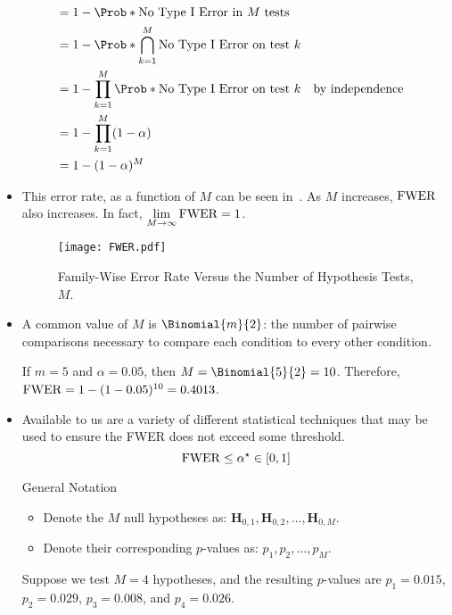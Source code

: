\begin{itemize}
\begin{align*}
               & =1-\Prob*{\text{No Type I Error in $ M $ tests}}                                           \\
               & =1-\Prob*{\bigcap_{k=1}^M\text{No Type I Error on test $ k $}}                             \\
               & =1-\prod_{k=1}^M\Prob*{\text{No Type I Error on test $ k $}}   &  & \text{by independence} \\
               & =1-\prod_{k=1}^M(1-\alpha)                                                                 \\
               & =1-(1-\alpha)^M
          \end{align*}
    \item This error rate, as a function of $M$ can be seen in~. As $ M $ increases, $ \operatorname{FWER} $ also increases.
          In fact, $ \lim\limits_{{M} \to {\infty}} \operatorname{FWER}=1 $.
          \begin{figure}[!htbp]
              \centering
              \texttt{[image: FWER.pdf]}
              \caption{Family-Wise Error Rate Versus the Number of Hypothesis Tests, $M$.}\label{fig:FWER}
          \end{figure}
    \item A common value of $ M $ is $ \Binomial{m}{2} $: the number of pairwise comparisons necessary to compare each condition
          to every other condition.
          \begin{Example}{}{}
              If $ m=5 $ and $ \alpha=0.05 $, then $ M=\Binomial{5}{2}=10 $. Therefore, $ \operatorname{FWER}=1-(1-0.05)^{10}=0.4013 $.
          \end{Example}
    \item Available to us are a variety of different statistical techniques that may be used to ensure the FWER
          does not exceed some threshold.
          \[ \operatorname{FWER}\le \alpha^\star \in[0,1] \]
          \begin{Remark}{General Notation}{}
              \begin{itemize}
                  \item Denote the $ M $ null hypotheses as: $ \mathbf{H}_{0,1},\mathbf{H}_{0,2},\ldots,\mathbf{H}_{0,M} $.
                  \item Denote their corresponding $ p $-values as: $ p_1,p_2,\ldots,p_M $.
              \end{itemize}
          \end{Remark}
          \begin{Example}{}{}
              Suppose we test $ M =4 $ hypotheses, and the resulting $ p $-values are $ p_1 =0.015$, $ p_2=0.029 $,
              $ p_3=0.008 $, and $ p_4=0.026 $.
          \end{Example}
\end{itemize}
